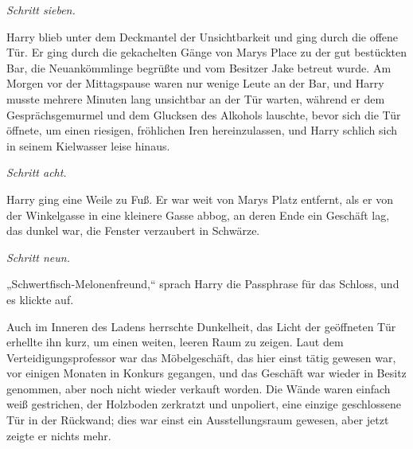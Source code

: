 \emph{Schritt sieben.}

Harry blieb unter dem Deckmantel der Unsichtbarkeit und ging durch die offene Tür. Er ging durch die gekachelten Gänge von Marys Place zu der gut bestückten Bar, die Neuankömmlinge begrüßte und vom Besitzer Jake betreut wurde. Am Morgen vor der Mittagspause waren nur wenige Leute an der Bar, und Harry musste mehrere Minuten lang unsichtbar an der Tür warten, während er dem Gesprächsgemurmel und dem Glucksen des Alkohols lauschte, bevor sich die Tür öffnete, um einen riesigen, fröhlichen Iren hereinzulassen, und Harry schlich sich in seinem Kielwasser leise hinaus.

\emph{Schritt acht.}

Harry ging eine Weile zu Fuß. Er war weit von Marys Platz entfernt, als er von der Winkelgasse in eine kleinere Gasse abbog, an deren Ende ein Geschäft lag, das dunkel war, die Fenster verzaubert in Schwärze.

\emph{Schritt neun.}

„Schwertfisch-Melonenfreund,“ sprach Harry die Passphrase für das Schloss, und es klickte auf.

Auch im Inneren des Ladens herrschte Dunkelheit, das Licht der geöffneten Tür erhellte ihn kurz, um einen weiten, leeren Raum zu zeigen. Laut dem Verteidigungsprofessor war das Möbelgeschäft, das hier einst tätig gewesen war, vor einigen Monaten in Konkurs gegangen, und das Geschäft war wieder in Besitz genommen, aber noch nicht wieder verkauft worden. Die Wände waren einfach weiß gestrichen, der Holzboden zerkratzt und unpoliert, eine einzige geschlossene Tür in der Rückwand; dies war einst ein Ausstellungsraum gewesen, aber jetzt zeigte er nichts mehr.

